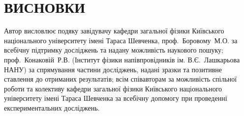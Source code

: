 \chapter*{\MakeUppercase{Висновки}}						%




Автор висловлює подяку
завідувачу кафедри загальної фізики Київського національного університету імені Тараса Шевченка,
проф.~Боровому~М.\:О. за всебічну підтримку досліджень та надану можливість наукового пошуку;
проф.~Конаковій~Р.\:В. (Інститут фізики напівпровідників ім. В.\:Є.~Лашкарьова НАНУ) за спрямування частини досліджень, надані зразки та позитивне ставлення до отриманих результатів;
всім співавторам за можливість спільної роботи
та колективу кафедри загальної фізики
Київського національного університету імені Тараса Шевченка
за всебічну допомогу при проведенні експериментальних досліджень.

